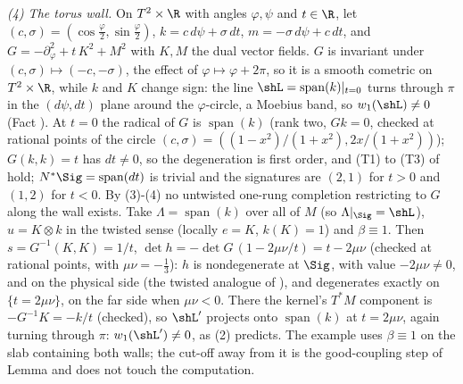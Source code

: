 \emph{(4) The torus wall.} On $T^2 \times \R$ with angles $\varphi, \psi$ and $t \in \R$, let $(c, \sigma) = (\cos\tfrac\varphi2, \sin\tfrac\varphi2)$, $k = c\,d\psi + \sigma\,dt$, $m = -\sigma\,d\psi + c\,dt$, and $G = -\partial_\varphi^2 + t\,K^2 + M^2$ with $K, M$ the dual vector fields. $G$ is invariant under $(c,\sigma) \mapsto (-c,-\sigma)$, the effect of $\varphi \mapsto \varphi + 2\pi$, so it is a smooth cometric on $T^2 \times \R$, while $k$ and $K$ change sign: the line $\shL = \operatorname{span}(k)|_{t=0}$ turns through $\pi$ in the $(d\psi, dt)$ plane around the $\varphi$-circle, a Moebius band, so $w_1(\shL) \neq 0$ (Fact ). At $t = 0$ the radical of $G$ is $\operatorname{span}(k)$ (rank two, $Gk = 0$, checked at rational points of the circle $(c,\sigma) = ((1-x^2)/(1+x^2), 2x/(1+x^2))$); $G(k,k) = t$ has $dt \neq 0$, so the degeneration is first order, and (T1) to (T3) of  hold; $N^*\Sig = \operatorname{span}(dt)$ is trivial and the signatures are $(2,1)$ for $t > 0$ and $(1,2)$ for $t < 0$. By (3)-(4) no untwisted one-rung completion restricting to $G$ along the wall exists. Take $\Lambda = \operatorname{span}(k)$ over all of $M$ (so $\Lambda|_\Sig = \shL$), $u = K \otimes k$ in the twisted sense (locally $e = K$, $k(K) = 1$) and $\beta \equiv 1$. Then $s = G^{-1}(K, K) = 1/t$, $\det h = -\det G\,(1 - 2\mu\nu/t) = t - 2\mu\nu$ (checked at rational points, with $\mu\nu = -\tfrac13$): $h$ is nondegenerate at $\Sig$, with value $-2\mu\nu \neq 0$, and on the physical side (the twisted analogue of ), and degenerates exactly on $\{t = 2\mu\nu\}$, on the far side when $\mu\nu < 0$. There the kernel's $T^*M$ component is $-G^{-1}K = -k/t$ (checked), so $\shL'$ projects onto $\operatorname{span}(k)$ at $t = 2\mu\nu$, again turning through $\pi$: $w_1(\shL') \neq 0$, as (2) predicts. The example uses $\beta \equiv 1$ on the slab containing both walls; the cut-off away from it is the good-coupling step of Lemma  and does not touch the computation.
